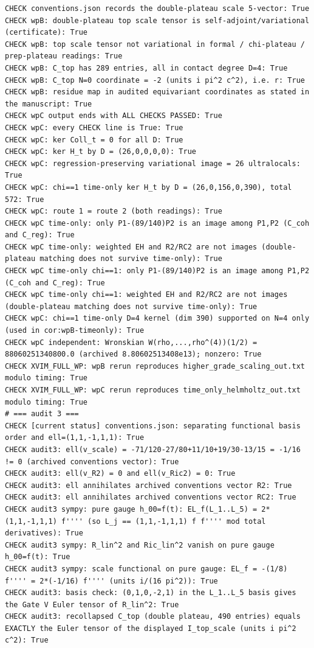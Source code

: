 \documentclass{article}
\theoremstyle{remark}
\begin{document}
\begin{lstlisting}
CHECK conventions.json records the double-plateau scale 5-vector: True
CHECK wpB: double-plateau top scale tensor is self-adjoint/variational (certificate): True
CHECK wpB: top scale tensor not variational in formal / chi-plateau / prep-plateau readings: True
CHECK wpB: C_top has 289 entries, all in contact degree D=4: True
CHECK wpB: C_top N=0 coordinate = -2 (units i pi^2 c^2), i.e. r: True
CHECK wpB: residue map in audited equivariant coordinates as stated in the manuscript: True
CHECK wpC output ends with ALL CHECKS PASSED: True
CHECK wpC: every CHECK line is True: True
CHECK wpC: ker Coll_t = 0 for all D: True
CHECK wpC: ker H_t by D = (26,0,0,0,0): True
CHECK wpC: regression-preserving variational image = 26 ultralocals: True
CHECK wpC: chi==1 time-only ker H_t by D = (26,0,156,0,390), total 572: True
CHECK wpC: route 1 = route 2 (both readings): True
CHECK wpC time-only: only P1-(89/140)P2 is an image among P1,P2 (C_coh and C_reg): True
CHECK wpC time-only: weighted EH and R2/RC2 are not images (double-plateau matching does not survive time-only): True
CHECK wpC time-only chi==1: only P1-(89/140)P2 is an image among P1,P2 (C_coh and C_reg): True
CHECK wpC time-only chi==1: weighted EH and R2/RC2 are not images (double-plateau matching does not survive time-only): True
CHECK wpC: chi==1 time-only D=4 kernel (dim 390) supported on N=4 only (used in cor:wpB-timeonly): True
CHECK wpC independent: Wronskian W(rho,...,rho^(4))(1/2) = 88060251340800.0 (archived 8.80602513408e13); nonzero: True
CHECK XVIM_FULL_WP: wpB rerun reproduces higher_grade_scaling_out.txt modulo timing: True
CHECK XVIM_FULL_WP: wpC rerun reproduces time_only_helmholtz_out.txt modulo timing: True
# === audit 3 ===
CHECK [current status] conventions.json: separating functional basis order and ell=(1,1,-1,1,1): True
CHECK audit3: ell(v_scale) = -71/120-27/80+11/10+19/30-13/15 = -1/16 != 0 (archived conventions vector): True
CHECK audit3: ell(v_R2) = 0 and ell(v_Ric2) = 0: True
CHECK audit3: ell annihilates archived conventions vector R2: True
CHECK audit3: ell annihilates archived conventions vector RC2: True
CHECK audit3 sympy: pure gauge h_00=f(t): EL_f(L_1..L_5) = 2*(1,1,-1,1,1) f'''' (so L_j == (1,1,-1,1,1) f f'''' mod total derivatives): True
CHECK audit3 sympy: R_lin^2 and Ric_lin^2 vanish on pure gauge h_00=f(t): True
CHECK audit3 sympy: scale functional on pure gauge: EL_f = -(1/8) f'''' = 2*(-1/16) f'''' (units i/(16 pi^2)): True
CHECK audit3: basis check: (0,1,0,-2,1) in the L_1..L_5 basis gives the Gate V Euler tensor of R_lin^2: True
CHECK audit3: recollapsed C_top (double plateau, 490 entries) equals EXACTLY the Euler tensor of the displayed I_top_scale (units i pi^2 c^2): True

\end{lstlisting}
\end{document}

